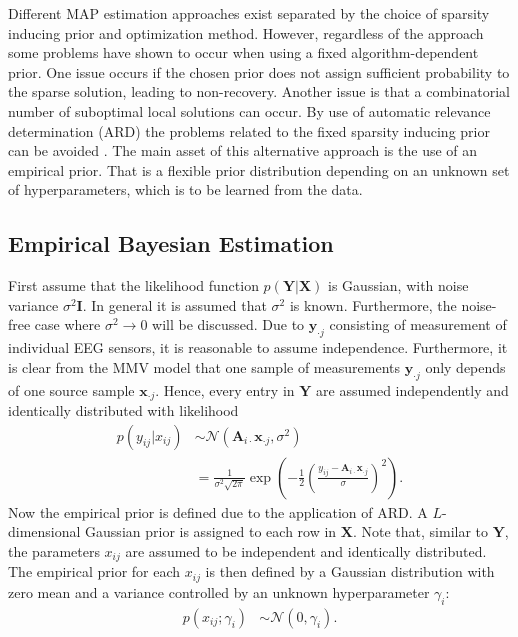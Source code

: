 Different MAP estimation approaches exist separated by the choice of sparsity inducing prior and optimization method. 
However, regardless of the approach some problems have shown to occur when using a fixed algorithm-dependent prior. 
One issue occurs if the chosen prior does not assign sufficient probability to the sparse solution, leading to non-recovery.
Another issue is that a combinatorial number of suboptimal local solutions can occur.
By use of automatic relevance determination (ARD) the problems related to the fixed sparsity inducing prior can be avoided \cite[p. 20]{phd_wipf}. 
The main asset of this alternative approach is the use of an empirical prior. 
That is a flexible prior distribution depending on an unknown set of hyperparameters, which is to be learned from the data.
 
\subsection{Empirical Bayesian Estimation}\label{seg:EBE}
First assume that the likelihood function $p(\mathbf{Y} \vert \mathbf{X})$ is Gaussian, with noise variance $\sigma^2\mathbf{I}$. 
In general it is assumed that $\sigma^2$ is known. 
Furthermore, the noise-free case where $\sigma^2 \rightarrow 0$ will be discussed. 
Due to $\mathbf{y}_{\cdot j}$ consisting of measurement of individual EEG sensors, it is reasonable to assume independence. 
Furthermore, it is clear from the MMV model that one sample of measurements $\mathbf{y}_{\cdot j}$ only depends of one source sample $\mathbf{x}_{\cdot j}$. Hence, every entry in $\mathbf{Y}$ are assumed independently and identically distributed with likelihood 
\begin{align*}
p(y_{ij}\vert x_{ij}) &\sim \mathcal{N}(\mathbf{A}_{i \cdot}\textbf{x}_{\cdot j}, \sigma^2) \\
& = \frac{1}{\sigma^2\sqrt{2\pi}}\exp\left( -\frac{1}{2}\left( \frac{y_{ij}- \mathbf{A}_{i \cdot}\textbf{x}_{\cdot j}}{\sigma}\right)^{2}\right).
\end{align*}
Now the empirical prior is defined due to the application of ARD. 
A $L$-dimensional Gaussian prior is assigned to each row in $\mathbf{X}$. 
Note that, similar to $\mathbf{Y}$, the parameters $x_{ij}$ are assumed to be independent and identically distributed.
The empirical prior for each $x_{ij}$ is then defined by a Gaussian distribution with zero mean and a variance controlled by an unknown hyperparameter $\gamma_i$:
\begin{align*}
p (x_{i j} ; \gamma_i) &\sim \mathcal{N}(0, \gamma_i).
\end{align*}
